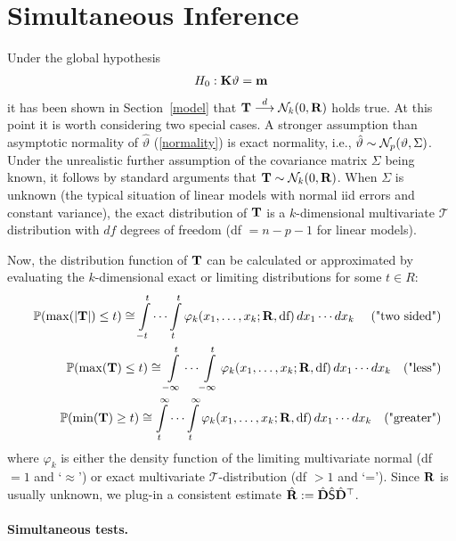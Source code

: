 \documentclass[12pt]{article}
\begin{document}
\section{Simultaneous Inference} \label{siminf}

Under the global hypothesis
\begin{eqnarray*}
H_0: \mathbf{K} \vartheta = \mathbf{m}
\end{eqnarray*}
it has been shown in Section~\ref{model} that 
$\mathbf{T} \stackrel{d}{\longrightarrow} \mathcal{N}_k(0, \mathbf{R})$ holds true. At this point it is worth
considering two special cases. A stronger assumption than asymptotic normality
of $\hat{\vartheta}$ (\ref{normality}) is exact normality, i.e., 
$\hat{\vartheta} \sim \mathcal{N}_p(\vartheta, \Sigma)$. Under the unrealistic
further assumption of the covariance matrix $\Sigma$ being known, it
follows by standard arguments that $\mathbf{T} \sim \mathcal{N}_k(0, \mathbf{R})$. 
When $\Sigma$ is unknown (the typical situation of linear models
with normal iid errors and constant variance), the
exact distribution of $\mathbf{T}$ is a $k$-dimensional multivariate $\mathcal{T}$
distribution with $df$ degrees of freedom (df $ = n - p - 1$ for linear models).

Now, the distribution function of $\mathbf{T}$ can be calculated or approximated
by evaluating the $k$-dimensional exact or limiting distributions for some $t \in R$:
\begin{eqnarray*}
& & \mathbb{P}(\max(|\mathbf{T}|) \le t)  \cong  \int\limits_{-t}^t \cdots \int\limits_{t}^t 
\varphi_k(x_1, \dots, x_k; \mathbf{R}, \text{df}) \, dx_1 \cdots dx_k \quad \text{ ("two sided")}\\
& & \mathbb{P}(\max(\mathbf{T}) \le t)  \cong\int\limits_{-\infty}^t \cdots \int\limits_{-\infty}^t 
\varphi_k(x_1, \dots, x_k; \mathbf{R}, \text{df}) \, dx_1 \cdots dx_k \quad \text{("less")}\\
& & \mathbb{P}(\min(\mathbf{T}) \ge t) \cong  \int\limits_{t}^\infty \cdots \int\limits_{t}^\infty \varphi_k(x_1, \dots, x_k; \mathbf{R}, \text{df}) \, dx_1 \cdots dx_k \quad \text{("greater")}\\
\end{eqnarray*}
where $\varphi_k$ is either the density function of the limiting multivariate
normal (df $ = 1$ and `$\approx$') or exact multivariate $\mathcal{T}$-distribution (df $ > 1$
and `='). 
Since $\mathbf{R}$ is usually unknown, we plug-in a consistent estimate
$\hat{\mathbf{R}} := \hat{\mathbf{D}} \hat{\textsf{S}} \hat{\mathbf{D}}^\top$.

\paragraph{Simultaneous tests.}
\end{document}
